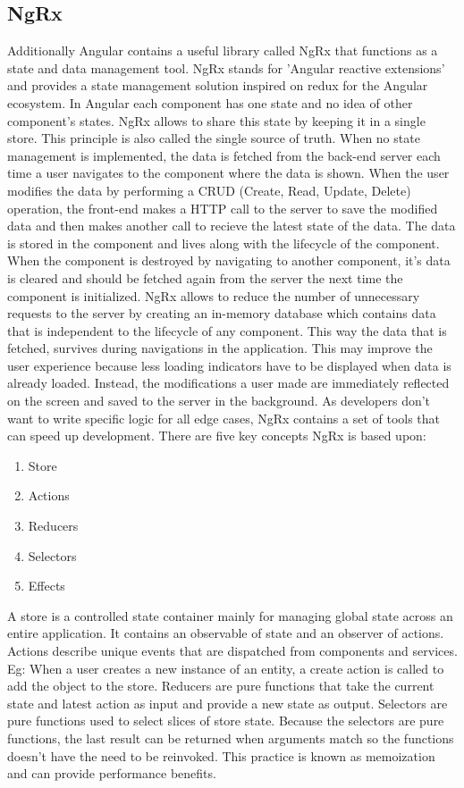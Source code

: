 \subsection{NgRx}
Additionally Angular contains a useful library called NgRx that functions as a state and data management tool. NgRx stands for 'Angular reactive extensions' and provides a state management solution inspired on redux for the Angular ecosystem. \autocite{AngularUni2020} In Angular each component has one state and no idea of other component's states. NgRx allows to share this state by keeping it in a single store. This principle is also called the single source of truth.
\autocite{AltexSoft}
When no state management is implemented, the data is fetched from the back-end server each time a user navigates to the component where the data is shown. When the user modifies the data by performing a CRUD (Create, Read, Update, Delete) operation, the front-end makes a HTTP call to the server to save the modified data and then makes another call to recieve the latest state of the data. The data is stored in the component and lives along with the lifecycle of the component. When the component is destroyed by navigating to another component, it's data is cleared and should be fetched again from the server the next time the component is initialized. NgRx allows to reduce the number of unnecessary requests to the server by creating an in-memory database which contains data that is independent to the lifecycle of any component. This way the data that is fetched, survives during navigations in the application. This may improve the user experience because less loading indicators have to be displayed when data is already loaded. Instead, the modifications a user made are immediately reflected on the screen and saved to the server in the background. \autocite{Simon2018}
As developers don't want to write specific logic for all edge cases, NgRx contains a set of tools that can speed up development. There are five key concepts NgRx is based upon:
\begin{enumerate}
	\item Store
	\item Actions
	\item Reducers
	\item Selectors
	\item Effects
\end{enumerate}
\autocite{NgRxStore}

A store is a controlled state container mainly for managing global state across an entire application. It contains an observable of state and an observer of actions. \autocite{NgRxStore}
Actions describe unique events that are dispatched from components and services. Eg: When a user creates a new instance of an entity, a create action is called to add the object to the store.
\autocite{NgRxActions}
Reducers are pure functions that take the current state and latest action as input and provide a new state as output. Selectors are pure functions used to select slices of store state. Because the selectors are pure functions, the last result can be returned when arguments match so the functions doesn't have the need to be reinvoked. This practice is known as memoization and can provide performance benefits. \autocite{NgRxSelectors}

